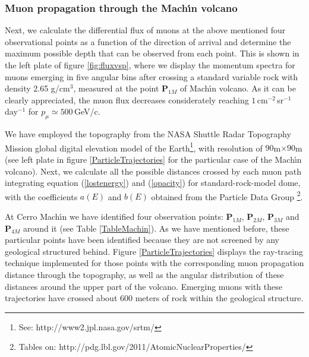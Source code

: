 \documentclass[letterpaper,10pt,titlepage,linenumber]{article}
\begin{document}
\subsubsection{Muon propagation through the Mach\'{\i}n volcano}
Next, we calculate the differential flux of muons at the above mentioned four observational points as a function of the direction of arrival and determine the maximum possible depth that can be observed from each point. This is shown in the left plate of figure \ref{fig:fluxvsp}, where we display the momentum spectra for muons emerging in five angular bins after crossing a standard variable rock with density 2.65 g/cm$^3$, measured at the point {\bf P$_{1M}$} of Mach\'{\i}n volcano.  As it can be clearly appreciated, the muon flux decreases considerately reaching $1$\,cm$^{-2}$\,sr$^{-1}$\,day$^{-1}$ for $p_\mu \simeq 500$\,GeV/c. 

We have employed the topography from the NASA Shuttle Radar Topography Mission global digital elevation model of the Earth\footnote{See: http://www2.jpl.nasa.gov/srtm/}, with resolution of $90$m$\times 90$m (see left plate in figure \ref{ParticleTrajectories} for the particular case of the Mach\'{\i}n volcano). Next,  we calculate all the possible distances crossed by each muon path integrating equation (\ref{lostenergy})  and (\ref{opacity}) for standard-rock-model dome, with the coefficients $a(E)$ and $b(E)$ obtained from the Particle Data Group\cite{OliveEtal2014} \footnote{Tables on: http://pdg.lbl.gov/2011/AtomicNuclearProperties/}.

At Cerro Mach\'{\i}n we have identified four observation points: {\bf P$_{1M}$}, {\bf P$_{2M}$}, {\bf P$_{3M}$} and {\bf P$_{4M}$}  around it  (see Table \ref{TableMachin}). As we have mentioned before, these particular points have been identified because they are not screened by any geological structured behind. Figure \ref{ParticleTrajectories} displays the ray-tracing technique implemented for those  points with the corresponding  muon propagation distance through the topography, as well as the angular distribution of these distances around the upper part of the volcano. Emerging muons with these trajectories have crossed about 600 meters of rock within the geological structure.
 
\end{document}
